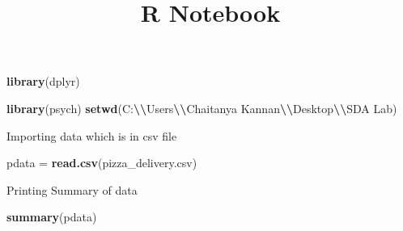 \documentclass[
]{article}
\title{R Notebook}
\author{}
\date{\vspace{-2.5em}}
\newenvironment{Shaded}{\begin{snugshade}}{\end{snugshade}}
\newcommand{\FunctionTok}[1]{\textcolor[rgb]{0.13,0.29,0.53}{\textbf{#1}}}
\newcommand{\NormalTok}[1]{#1}
\newcommand{\OtherTok}[1]{\textcolor[rgb]{0.56,0.35,0.01}{#1}}
\newcommand{\SpecialCharTok}[1]{\textcolor[rgb]{0.81,0.36,0.00}{\textbf{#1}}}
\newcommand{\StringTok}[1]{\textcolor[rgb]{0.31,0.60,0.02}{#1}}
\begin{document}
\maketitle

\begin{Shaded}
\begin{Highlighting}[]
\FunctionTok{library}\NormalTok{(dplyr)}
\end{Highlighting}
\end{Shaded}

\begin{Shaded}
\begin{Highlighting}[]
\FunctionTok{library}\NormalTok{(psych)}
\FunctionTok{setwd}\NormalTok{(}\StringTok{\textquotesingle{}C:}\SpecialCharTok{\textbackslash{}\textbackslash{}}\StringTok{Users}\SpecialCharTok{\textbackslash{}\textbackslash{}}\StringTok{Chaitanya Kannan}\SpecialCharTok{\textbackslash{}\textbackslash{}}\StringTok{Desktop}\SpecialCharTok{\textbackslash{}\textbackslash{}}\StringTok{SDA Lab\textquotesingle{}}\NormalTok{)}
\end{Highlighting}
\end{Shaded}

Importing data which is in csv file

\begin{Shaded}
\begin{Highlighting}[]
\NormalTok{pdata }\OtherTok{=} \FunctionTok{read.csv}\NormalTok{(}\StringTok{\textquotesingle{}pizza\_delivery.csv\textquotesingle{}}\NormalTok{)}
\end{Highlighting}
\end{Shaded}

Printing Summary of data

\begin{Shaded}
\begin{Highlighting}[]
\FunctionTok{summary}\NormalTok{(pdata)}
\end{Highlighting}
\end{Shaded}
\end{document}
